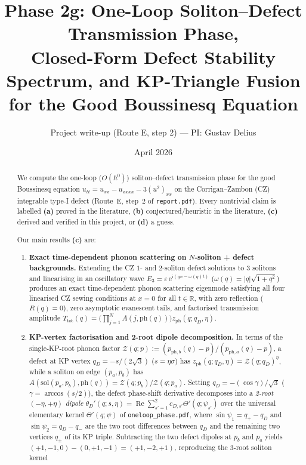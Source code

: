 \documentclass[11pt,a4paper]{article}
\title{\textbf{Phase 2g: One-Loop Soliton--Defect Transmission Phase,\\
Closed-Form Defect Stability Spectrum, and KP-Triangle Fusion\\
for the Good Boussinesq Equation}}
\author{Project write-up (Route E, step 2) --- PI: Gustav Delius}
\date{April 2026}
\newcommand{\ii}{\mathrm{i}}
\newcommand{\ee}{\mathrm{e}}
\newcommand{\hb}{\hbar}
\newcommand{\Rea}{\operatorname{Re}}
\begin{document}
\maketitle

\begin{abstract}
We compute the one-loop ($O(\hb^0)$) soliton--defect transmission phase for the
good Boussinesq equation $u_{tt} = u_{xx} - u_{xxxx} - 3(u^2)_{xx}$ on the
Corrigan--Zambon (CZ) integrable type-I defect (Route~E, step~2 of
\texttt{report.pdf}). Every nontrivial claim is labelled \textbf{(a)} proved in
the literature, \textbf{(b)} conjectured/heuristic in the literature,
\textbf{(c)} derived and verified in this project, or \textbf{(d)} a guess.

Our main results \textbf{(c)} are:
\begin{enumerate}
\item \textbf{Exact time-dependent phonon scattering on $N$-soliton + defect backgrounds.}
Extending the CZ $1$- and $2$-soliton defect solutions to $3$ solitons and
linearising in an oscillatory wave $E_3 = \varepsilon\,\ee^{\ii(qx-\omega(q)t)}$
($\omega(q) = |q|\sqrt{1+q^2}$) produces an exact time-dependent phonon
scattering eigenmode satisfying all four linearised CZ sewing conditions at
$x=0$ for all $t \in \mathbb{R}$, with zero reflection ($R(q)=0$), zero
asymptotic evanescent tails, and factorised transmission amplitude
$T_{\mathrm{tot}}(q) = \big(\prod_{j=1}^N A(j,\mathrm{ph}(q))\big)z_{\mathrm{ph}}(q;q_D,\eta)$.
\item \textbf{KP-vertex factorisation and 2-root dipole decomposition.}
In terms of the single-KP-root phonon factor
$\mathcal{Z}(q;p) := (p_{\mathrm{ph},b}(q)-p)/(p_{\mathrm{ph},a}(q)-p)$, a
defect at KP vertex $q_D = -s/(2\sqrt{3})$ ($s=\eta\sigma$) has
$z_{\mathrm{ph}}(q;q_D,\eta) = \mathcal{Z}(q;q_D)^\eta$, while a soliton on edge
$(p_a,p_b)$ has $A(\mathrm{sol}(p_a,p_b),\mathrm{ph}(q)) = \mathcal{Z}(q;p_b)/\mathcal{Z}(q;p_a)$.
Setting $q_D = -(\cos\gamma)/\sqrt{3}$ ($\gamma = \arccos(s/2)$), the defect
phase-shift derivative decomposes into a \emph{2-root $(-\eta,+\eta)$ dipole}
$\theta_D'(q;s,\eta) = \Rea\sum_{s'=1}^2 c_{D,s'}\Theta'(q;\psi_{s'})$ over the
universal elementary kernel $\Theta'(q;\psi)$ of \texttt{oneloop\_phase.pdf},
where $\sin\psi_1 = q_+ - q_D$ and $\sin\psi_2 = q_D - q_-$ are the two root
differences between $q_D$ and the remaining two vertices $q_\pm$ of its KP
triple. Subtracting the two defect dipoles at $p_b$ and $p_a$ yields
$(+1,-1,0) - (0,+1,-1) = (+1,-2,+1)$, reproducing the 3-root soliton kernel

\end{enumerate}
\end{abstract}
\end{document}
